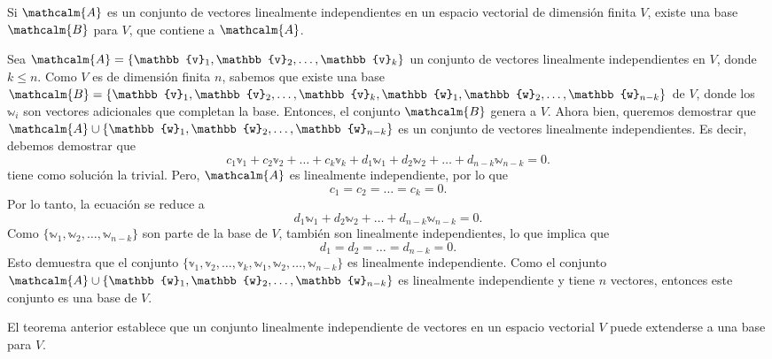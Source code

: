\begin{theorem}{}{}
    Si $\mathcalm{A}$ es un conjunto de vectores linealmente independientes en un espacio vectorial de dimensión finita $V$, existe una base $\mathcalm{B}$ para $V$, que contiene a $\mathcalm{A}$.

    \tcblower
    \demostracion Sea $\mathcalm{A} = \{ \mathbb{v}_1, \mathbb{v}_2, \dots, \mathbb{v}_k \}$ un conjunto de vectores linealmente independientes en $V$, donde $k \leq n$. Como $V$ es de dimensión finita $n$, sabemos que existe una base $\mathcalm{B} = \{ \mathbb{v}_1, \mathbb{v}_2, \dots, \mathbb{v}_k, \mathbb{w}_1, \mathbb{w}_2, \dots, \mathbb{w}_{n-k} \}$ de $V$, donde los $\mathbb{w}_i$ son vectores adicionales que completan la base. Entonces, el conjunto $\mathcalm{B}$ genera a $V$. Ahora bien, queremos demostrar que $\mathcalm{A} \cup \{\mathbb{w}_1, \mathbb{w}_2, \dots, \mathbb{w}_{n-k}\}$ es un conjunto de vectores linealmente independientes. Es decir, debemos demostrar que
    $$c_1 \mathbb{v}_1 + c_2 \mathbb{v}_2 + \dots + c_k \mathbb{v}_k + d_1 \mathbb{w}_1 + d_2 \mathbb{w}_2 + \dots + d_{n-k} \mathbb{w}_{n-k} = 0.$$
    tiene como solución la trivial. Pero, $\mathcalm{A}$ es linealmente independiente, por lo que
    $$c_1 = c_2 = \dots = c_k = 0.$$
    \newpage
    Por lo tanto, la ecuación se reduce a
    $$d_1 \mathbb{w}_1 + d_2 \mathbb{w}_2 + \dots + d_{n-k} \mathbb{w}_{n-k} = 0.$$
    Como $\{ \mathbb{w}_1, \mathbb{w}_2, \dots, \mathbb{w}_{n-k} \}$ son parte de la base de $V$, también son linealmente independientes, lo que implica que
    $$d_1 = d_2 = \dots = d_{n-k} = 0.$$
	Esto demuestra que el conjunto $\{ \mathbb{v}_1, \mathbb{v}_2, \dots, \mathbb{v}_k, \mathbb{w}_1, \mathbb{w}_2, \dots, \mathbb{w}_{n-k} \}$ es linealmente independiente. Como el conjunto $\mathcalm{A} \cup \{ \mathbb{w}_1, \mathbb{w}_2, \dots, \mathbb{w}_{n-k} \}$ es linealmente independiente y tiene $n$ vectores, entonces este conjunto es una base de $V$.
\end{theorem}

El teorema anterior establece que un conjunto linealmente independiente de vectores en un espacio vectorial $V$ puede extenderse a una base para $V$.

